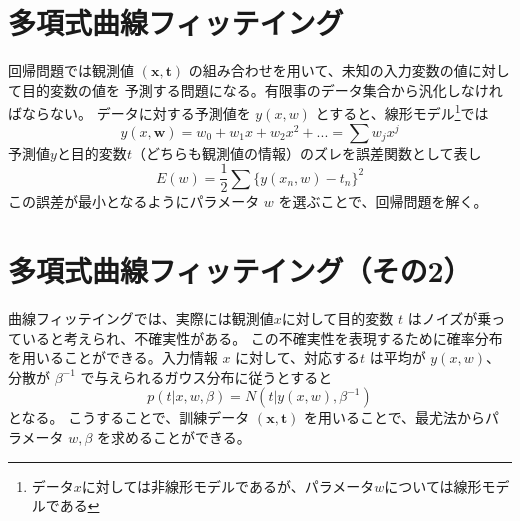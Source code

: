 \documentclass[10pt, a4paper]{ltjsarticle}
\begin{document}
\section{多項式曲線フィッテイング}

回帰問題では観測値 $(\bm{x}, \bm{t})$ の組み合わせを用いて、未知の入力変数の値に対して目的変数の値を
予測する問題になる。有限事のデータ集合から汎化しなければならない。
データに対する予測値を $y(x,w)$ とすると、線形モデル\footnote{データ$x$に対しては非線形モデルであるが、パラメータ$w$については線形モデルである}では
\begin{equation}
  y(x, \bm{w}) = w_0 + w_1x + w_2x^2 + ... = \sum w_jx^j
\end{equation}
予測値$y$と目的変数$t$（どちらも観測値の情報）のズレを誤差関数として表し
\begin{equation}
  E(w) = \frac{1}{2}\sum \{y(x_n, w) - t_n\} ^2
\end{equation}
この誤差が最小となるようにパラメータ $w$ を選ぶことで、回帰問題を解く。


\section{多項式曲線フィッテイング（その2）}

曲線フィッテイングでは、実際には観測値$x$に対して目的変数 $t$ はノイズが乗っていると考えられ、不確実性がある。
この不確実性を表現するために確率分布を用いることができる。入力情報 $x$ に対して、対応する$t$ は平均が $y(x,w)$、
分散が $\beta^{-1}$ で与えられるガウス分布に従うとすると
\begin{equation}
  p(t|x,w,\beta) = N(t|y(x,w), \beta^{-1})
\end{equation}
となる。
こうすることで、訓練データ $(\bm{x},\bm{t})$ を用いることで、最尤法からパラメータ $w,\beta$ を求めることができる。
\end{document}
